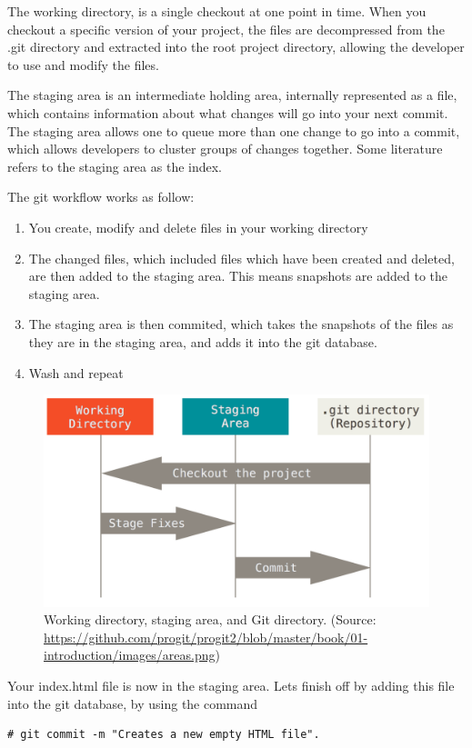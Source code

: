 \documentclass[a4paper,10pt]{article}
\begin{document}
The working directory, is a single checkout at one point in time. When you checkout a specific version of your project, the files are decompressed from the .git directory and extracted into the root project directory, allowing the developer to use and modify the files.

The staging area is an intermediate holding area, internally represented as a file, which contains information about what changes will go into your next commit. The staging area allows one to queue more than one change to go into a commit, which allows developers to cluster groups of changes together. Some literature refers to the staging area as the index.

The git workflow works as follow:

\begin{enumerate}
\item You create, modify and delete files in your working directory
\item The changed files, which included files which have been created and deleted, are then added to the staging area. This means snapshots are added to the staging area.
\item The staging area is then commited, which takes the snapshots of the files as they are in the staging area, and adds it into the git database.
\item Wash and repeat
\end{enumerate}

\begin{figure}[h]
\centering
\includegraphics[scale=0.3]{areas}
\caption{Working directory, staging area, and Git directory.
 (Source: \url{https://github.com/progit/progit2/blob/master/book/01-introduction/images/areas.png})}\label{fig:gitareas}
\end{figure}


Your index.html file is now in the staging area. Lets finish off by adding this file into the git database, by using the command 
\begin{lstlisting}[style=TerminalStyle]
# git commit -m "Creates a new empty HTML file". 
\end{lstlisting}
\end{document}
